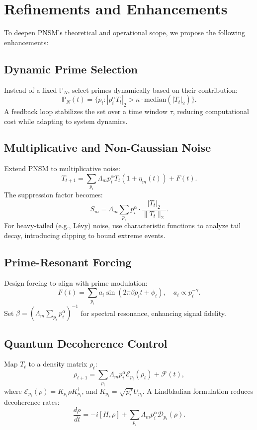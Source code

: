 \documentclass{article}
\theoremstyle{plain}
\begin{document}
\section{Refinements and Enhancements}
To deepen PNSM’s theoretical and operational scope, we propose the following enhancements:

\subsection{Dynamic Prime Selection}
Instead of a fixed \( \mathbb{P}_N \), select primes dynamically based on their contribution:
\begin{equation}
    \mathbb{P}_N(t) = \{ p_i : |p_i^\alpha T_t|_2 > \kappa \cdot \text{median}(|T_t|_2) \}.
\end{equation}
A feedback loop stabilizes the set over a time window \( \tau \), reducing computational cost while adapting to system dynamics.

\subsection{Multiplicative and Non-Gaussian Noise}
Extend PNSM to multiplicative noise:
\begin{equation}
    T_{t+1} = \sum_{p_i} \Lambda_m p_i^\alpha T_t (1 + \eta_m(t)) + F(t).
\end{equation}
The suppression factor becomes:
\begin{equation}
    S_m = \Lambda_m \sum_{p_i} p_i^\alpha \cdot \frac{|T_t|_2}{\|T_t\|_2}.
\end{equation}
For heavy-tailed (e.g., Lévy) noise, use characteristic functions to analyze tail decay, introducing clipping to bound extreme events.

\subsection{Prime-Resonant Forcing}
Design forcing to align with prime modulation:
\begin{equation}
    F(t) = \sum_{p_i} a_i \sin(2\pi \beta p_i t + \phi_i), \quad a_i \propto p_i^{-\gamma}.
\end{equation}
Set \( \beta = \left( \Lambda_m \sum_{p_i} p_i^\alpha \right)^{-1} \) for spectral resonance, enhancing signal fidelity.

\subsection{Quantum Decoherence Control}
Map \( T_t \) to a density matrix \( \rho_t \):
\begin{equation}
    \rho_{t+1} = \sum_{p_i} \Lambda_m p_i^\alpha \mathcal{E}_{p_i}(\rho_t) + \mathcal{F}(t),
\end{equation}
where \( \mathcal{E}_{p_i}(\rho) = K_{p_i} \rho K_{p_i}^\dagger \), and \( K_{p_i} = \sqrt{p_i^\alpha} U_{p_i} \). A Lindbladian formulation reduces decoherence rates:
\begin{equation}
    \frac{d\rho}{dt} = -i [H, \rho] + \sum_{p_i} \Lambda_m p_i^\alpha \mathcal{D}_{p_i}(\rho).
\end{equation}
\end{document}
